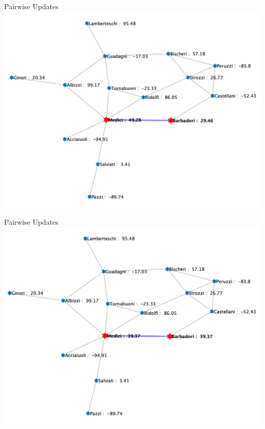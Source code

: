 \documentclass[usenames,dvipsnames,10pt]{beamer}
\theoremstyle{remark}
\begin{document}
\begin{frame}{Pairwise Updates}
    \centering
    \includegraphics[scale=.18]{../Figures/introP2.png}
\end{frame}

\begin{frame}{Pairwise Updates}
    \centering
    \includegraphics[scale=.18]{../Figures/introP3.png}
\end{frame}
\end{document}
